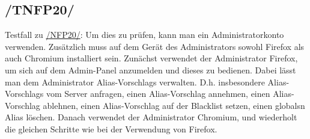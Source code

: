 \subsection*{/TNFP20/}
\label{/TNFP20/} Testfall zu \hyperref[/NFP20/]{/NFP20/}: Um dies zu prüfen, kann man ein \Gls{Administrator}konto verwenden. Zusätzlich muss auf dem Gerät des \Gls{Administrator}s sowohl \Gls{Firefox} als auch \Gls{Chromium} installiert sein. Zunächst verwendet der \Gls{Administrator} \Gls{Firefox}, um sich auf dem \Gls{Admin-Panel} anzumelden und dieses zu bedienen. Dabei lässt man dem \Gls{Administrator} \Glspl{Alias-Vorschlag} verwalten. D.h. insbesondere \Glspl{Alias-Vorschlag} vom \Gls{Server} anfragen, einen \Gls{Alias-Vorschlag} annehmen, einen \Gls{Alias-Vorschlag} ablehnen, einen \Gls{Alias-Vorschlag} auf der \Gls{Blacklist} setzen, einen \glspl{global}n \Gls{Alias} löschen. Danach verwendet der \Gls{Administrator} \Gls{Chromium}, und wiederholt die gleichen Schritte wie bei der Verwendung von \Gls{Firefox}.